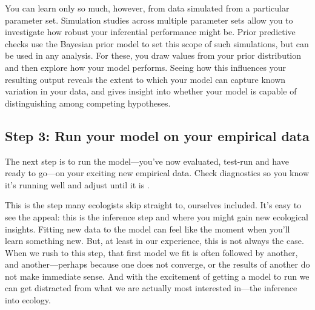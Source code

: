 \documentclass[11pt]{article}
\begin{document}
You can learn only so much, however, from data simulated from a particular parameter set. Simulation studies across multiple parameter sets allow you to investigate how robust your inferential performance might be. Prior predictive checks \citep{betanprior,wesner2021,winter2023} use the Bayesian prior model to set this scope of such simulations, but can be used in any analysis. For these, you draw values from your prior distribution and then explore how your model performs. Seeing how this influences your resulting output reveals the extent to which your model can capture known variation in your data, and gives insight into whether your model is capable of distinguishing among competing hypotheses. %


 \subsection*{Step 3: Run your model on your empirical data} 
 
The next step is to run the model---you've now evaluated, test-run and have ready to go---on your exciting new empirical data. Check diagnostics so you know it's running well and adjust until it is \citep[this includes a suite of convergence and efficiency metrics that are well-discussed elsewhere,][]{betanworkflow,gelman2020bayesian,vandeschoot2021,gabryvis}. %
 
This is the step many ecologists skip straight to, ourselves included. It's easy to see the appeal: this is the inference step and where you might gain new ecological insights. Fitting new data to the model can feel like the moment when you'll learn something new. But, at least in our experience, this is not always the case. When we rush to this step, that first model we fit is often followed by another, and another---perhaps because one does not converge, or the results of another do not make immediate sense. And with the excitement of getting a model to run we can get distracted from what we are actually most interested in---the inference into ecology. %
\end{document}
